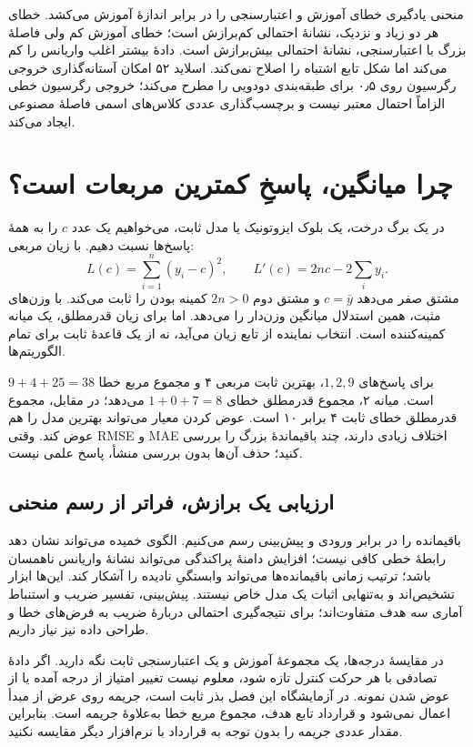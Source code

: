 منحنی یادگیری خطای آموزش و اعتبارسنجی را در برابر اندازهٔ آموزش می‌کشد. خطای هر دو زیاد و نزدیک، نشانهٔ احتمالی کم‌برازش است؛ خطای آموزش کم ولی فاصلهٔ بزرگ با اعتبارسنجی، نشانهٔ احتمالی بیش‌برازش است. دادهٔ بیشتر اغلب واریانس را کم می‌کند اما شکل تابع اشتباه را اصلاح نمی‌کند. اسلاید ۵۲ امکان آستانه‌گذاری خروجی رگرسیون روی ۰٫۵ برای طبقه‌بندی دودویی را مطرح می‌کند؛ خروجی رگرسیون خطی الزاماً احتمال معتبر نیست و برچسب‌گذاری عددی کلاس‌های اسمی فاصلهٔ مصنوعی ایجاد می‌کند.
\section{چرا میانگین، پاسخِ کمترین مربعات است؟}
در یک برگ درخت، یک بلوک ایزوتونیک یا مدل ثابت، می‌خواهیم یک عدد $c$ را به همهٔ پاسخ‌ها نسبت دهیم. با زیان مربعی:
\[L(c)=\sum_{i=1}^n(y_i-c)^2,\qquad L'(c)=2nc-2\sum_i y_i.\]
مشتق صفر می‌دهد $c=\bar y$ و مشتق دوم $2n>0$ کمینه بودن را ثابت می‌کند. با وزن‌های مثبت، همین استدلال میانگین وزن‌دار را می‌دهد. اما برای زیان قدرمطلق، یک میانه کمینه‌کننده است. انتخاب نماینده از تابع زیان می‌آید، نه از یک قاعدهٔ ثابت برای تمام الگوریتم‌ها.

برای پاسخ‌های $1,2,9$، بهترین ثابت مربعی ۴ و مجموع مربع خطا $9+4+25=38$ است. میانه ۲، مجموع قدرمطلق خطای $1+0+7=8$ می‌دهد؛ در مقابل، مجموع قدرمطلق خطای ثابت ۴ برابر ۱۰ است. عوض کردن معیار می‌تواند بهترین مدل را هم عوض کند. وقتی RMSE و MAE اختلاف زیادی دارند، چند باقیماندهٔ بزرگ را بررسی کنید؛ حذف آن‌ها بدون بررسی منشأ، پاسخ علمی نیست.

\subsection*{ارزیابی یک برازش، فراتر از رسم منحنی}
باقیمانده را در برابر ورودی و پیش‌بینی رسم می‌کنیم. الگوی خمیده می‌تواند نشان دهد رابطهٔ خطی کافی نیست؛ افزایش دامنهٔ پراکندگی می‌تواند نشانهٔ واریانس ناهمسان باشد؛ ترتیب زمانی باقیمانده‌ها می‌تواند وابستگیِ نادیده را آشکار کند. این‌ها ابزار تشخیص‌اند و به‌تنهایی اثبات یک مدل خاص نیستند. پیش‌بینی، تفسیر ضریب و استنباط آماری سه هدف متفاوت‌اند؛ برای نتیجه‌گیری احتمالی دربارهٔ ضریب به فرض‌های خطا و طراحی داده نیز نیاز داریم.

در مقایسهٔ درجه‌ها، یک مجموعهٔ آموزش و یک اعتبارسنجی ثابت نگه دارید. اگر دادهٔ تصادفی با هر حرکت کنترل تازه شود، معلوم نیست تغییر امتیاز از درجه آمده یا از عوض شدن نمونه. در آزمایشگاه این فصل بذر ثابت است، جریمه روی عرض از مبدأ اعمال نمی‌شود و قرارداد تابع هدف، مجموع مربع خطا به‌علاوهٔ جریمه است. بنابراین مقدار عددی جریمه را بدون توجه به قرارداد با نرم‌افزار دیگر مقایسه نکنید.

